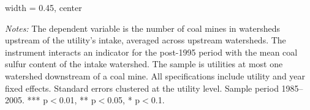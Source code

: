 \begin{table}[htbp]
\begin{adjustbox}{width = 0.45\textwidth, center}
      
   \end{adjustbox}
      {\tiny\linespread{1}\selectfont \par \raggedright 
   \textit{Notes:} The dependent variable is the number of coal mines in watersheds upstream of the utility's intake, averaged across upstream watersheds. The instrument interacts an indicator for the post-1995 period with the mean coal sulfur content of the intake watershed. The sample is utilities at most one watershed downstream of a coal mine. All specifications include utility and year fixed effects. Standard errors clustered at the utility level. Sample period 1985--2005. *** p$<$0.01, ** p$<$0.05, * p$<$0.1.}
   
\end{table}



